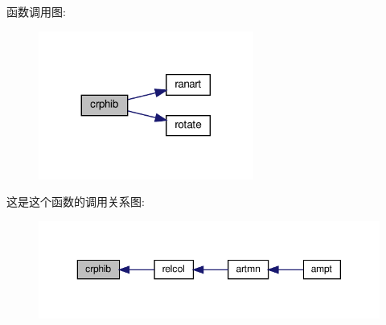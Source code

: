 函数调用图\+:
\nopagebreak
\begin{figure}[H]
\begin{center}
\leavevmode
\includegraphics[width=200pt]{crphib_8f90_ae72ee953c6d9377dc619b2fad7972fb4_cgraph}
\end{center}
\end{figure}
这是这个函数的调用关系图\+:
\nopagebreak
\begin{figure}[H]
\begin{center}
\leavevmode
\includegraphics[width=350pt]{crphib_8f90_ae72ee953c6d9377dc619b2fad7972fb4_icgraph}
\end{center}
\end{figure}
